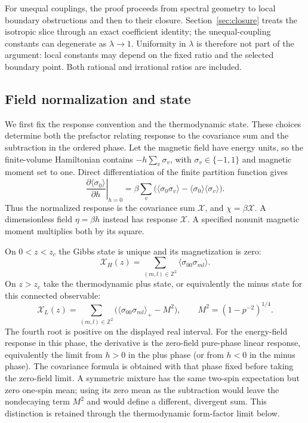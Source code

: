 \documentclass[11pt]{article}
\numberwithin{equation}{section}
\theoremstyle{definition}
\newcommand{\Z}{\mathbb Z}
\newcommand{\XH}{\mathcal X_H}
\newcommand{\XL}{\mathcal X_L}
\begin{document}
For unequal couplings, the proof proceeds from spectral geometry to
local boundary obstructions and then to their closure.
Section~\ref{sec:closure} treats the isotropic slice through an exact
coefficient identity; the unequal-coupling constants can degenerate as
$\lambda\to1$. Uniformity in $\lambda$ is therefore not part of the
argument: local constants may depend on the fixed ratio and the selected
boundary point. Both rational and irrational ratios are included.

\subsection{Field normalization and state}

We first fix the response convention and the thermodynamic state.
These choices determine both the prefactor relating response to the
covariance sum and the subtraction in the ordered phase.
Let the magnetic field have energy units, so the finite-volume Hamiltonian
contains $-h\sum_v\sigma_v$, with $\sigma_v\in\{-1,1\}$ and magnetic
moment set to one. Direct differentiation of the finite partition
function gives
\[
 \left.\frac{\partial\langle\sigma_0\rangle}{\partial h}\right|_{h=0}
 =\beta\sum_v\bigl(\langle\sigma_0\sigma_v\rangle
                         -\langle\sigma_0\rangle\langle\sigma_v\rangle\bigr).
\]
Thus the normalized response is the covariance sum $\mathcal X$, and
$\chi=\beta\mathcal X$. A dimensionless field $\eta=\beta h$ instead
has response $\mathcal X$. A specified nonunit magnetic moment multiplies
both by its square.

On $0<z<z_c$ the Gibbs state is unique and its magnetization is zero:
\[
 \XH(z)=\sum_{(m,l)\in\Z^2}\langle\sigma_{00}\sigma_{ml}\rangle.
\]
On $z>z_c$ take the thermodynamic plus state, or equivalently the minus
state for this connected observable:
\[
 \XL(z)=\sum_{(m,l)\in\Z^2}
       \bigl(\langle\sigma_{00}\sigma_{ml}\rangle_+-M^2\bigr),
 \qquad M^2=(1-p^{-2})^{1/4}.
\]
The fourth root is positive on the displayed real interval.
For the energy-field response in this phase, the derivative is the
zero-field pure-phase linear response, equivalently the limit from
$h>0$ in the plus phase (or from $h<0$ in the minus phase).
The covariance formula is obtained with that phase fixed before taking
the zero-field limit. A symmetric
mixture has the same two-spin expectation but zero one-spin mean; using
its zero mean as the subtraction would leave the nondecaying term $M^2$
and would define a different, divergent sum. This distinction is retained
through the thermodynamic form-factor limit below.
\end{document}
